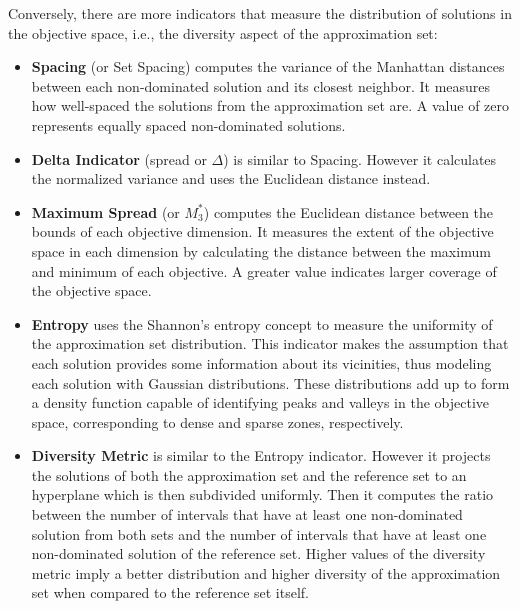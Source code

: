 Conversely, there are more indicators that measure the distribution of solutions in the objective space, i.e., the diversity aspect of the approximation set:
\begin{itemize}
\item  \textbf{Spacing} (or Set Spacing) computes the variance of the Manhattan distances between each non-dominated solution and its closest neighbor. It measures how well-spaced the solutions from the approximation set are. A value of zero represents equally spaced non-dominated solutions. 
\item \textbf{Delta Indicator} (spread or $\Delta$) is similar to Spacing. However it calculates the normalized variance and uses the Euclidean distance instead.
\item \textbf{Maximum Spread} (or \textbf{$M_3^\ast$}) computes the Euclidean distance between the bounds of each objective dimension. It measures the extent of the objective space in each dimension by calculating the distance between the maximum and minimum of each objective. A greater value indicates larger coverage of the objective space.
\item \textbf{Entropy} uses the Shannon's entropy concept to measure the uniformity of the approximation set distribution. This indicator makes the assumption that each solution provides some information about its vicinities, thus modeling each solution with Gaussian distributions. These distributions add up to form a density function capable of identifying peaks and valleys in the objective space, corresponding to dense and sparse zones, respectively. 
\item \textbf{Diversity Metric} is similar to the Entropy indicator. However it projects the solutions of both the approximation set and the reference set to an hyperplane which is then subdivided uniformly. Then it computes the ratio between the number of intervals that have at least one non-dominated solution from both sets and the number of intervals that have at least one non-dominated solution of the reference set. Higher values of the diversity metric imply a better distribution and higher diversity of the approximation set when compared to the reference set itself. 
\end{itemize}

